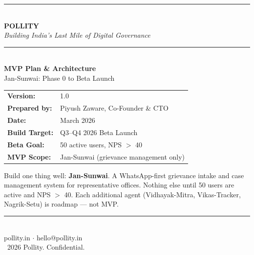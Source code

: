 \documentclass[12pt, a4paper]{article}
\begin{document}
\begin{titlepage}
    \centering
    \vspace*{1.5cm}

    {\color{pollityblue}\rule{\linewidth}{2pt}}\\[0.4cm]
    {\Huge\bfseries\color{pollityblue} POLLITY}\\[0.3cm]
    {\large\itshape Building India's Last Mile of Digital Governance}\\[0.2cm]
    {\color{pollityblue}\rule{\linewidth}{2pt}}\\[1.2cm]

    {\LARGE\bfseries MVP Plan \& Architecture}\\[0.4cm]
    {\large Jan-Sunwai: Phase 0 to Beta Launch}\\[1.2cm]

    \begin{tabular}{ll}
        \textbf{Version:}         & 1.0 \\[0.3em]
        \textbf{Prepared by:}     & Piyush Zaware, Co-Founder \& CTO \\[0.3em]
        \textbf{Date:}            & March 2026 \\[0.3em]
        \textbf{Build Target:}    & Q3--Q4 2026 Beta Launch \\[0.3em]
        \textbf{Beta Goal:}       & 50 active users, NPS $>$ 40 \\[0.3em]
        \textbf{MVP Scope:}       & Jan-Sunwai (grievance management only) \\
    \end{tabular}

    \vspace{1.5cm}

    \begin{thesisbox}
        Build one thing well: \textbf{Jan-Sunwai}. A WhatsApp-first grievance intake and case
        management system for representative offices. Nothing else until 50 users are
        active and NPS $>$ 40. Each additional agent (Vidhayak-Mitra, Vikas-Tracker,
        Nagrik-Setu) is roadmap --- not MVP.
    \end{thesisbox}

    \vfill

    {\color{midgray}\rule{0.5\linewidth}{0.5pt}}\\[0.3cm]
    {\small pollity.in \quad $\cdot$ \quad hello@pollity.in}\\
    {\small\textcopyright\ 2026 Pollity. Confidential.}
\end{titlepage}
\end{document}
